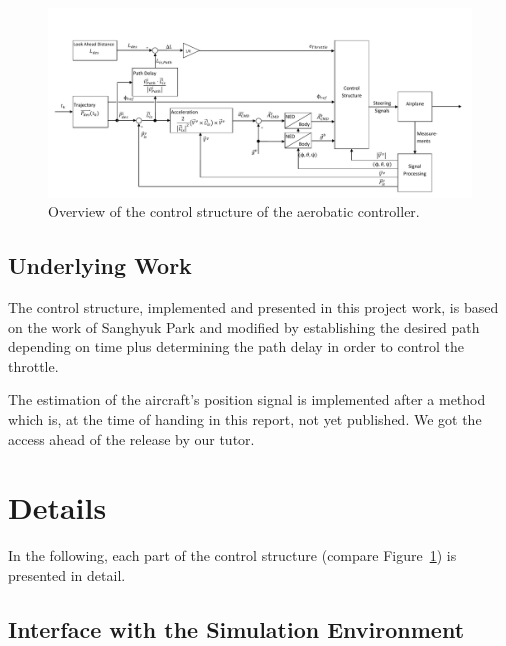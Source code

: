 \documentclass[11pt,a4paper]{scrartcl}		%
\begin{document}
\begin{figure}[!h]
  \begin{center}
  	\includegraphics[width=18.8cm, angle=90]{pictures/complete_structure.pdf}
  \end{center}
  \caption{Overview of the control structure of the aerobatic controller.}
  \label{fig_complete_structure}
\end{figure}


\subsection{Underlying Work}

The control structure, implemented and presented in this project work, is based on the work of Sanghyuk Park\cite{Park.2012} and modified by establishing the desired path depending on time plus determining the path delay in order to control the throttle.

The estimation of the aircraft's position signal is implemented after a method which is, at the time of handing in this report, not yet published. We got the access ahead of the release by our tutor.

\medskip





\section{Details}\label{ch_Details}

In the following, each part of the control structure (compare Figure~\ref{fig_complete_structure}) is presented in detail.

\medskip





\subsection{Interface with the Simulation Environment}
\end{document}
